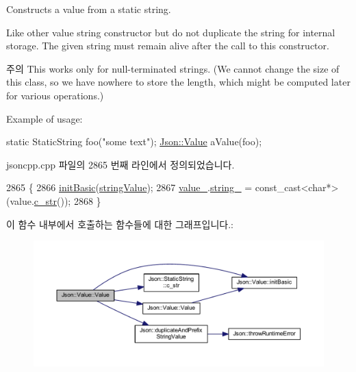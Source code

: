 Constructs a value from a static string. 

Like other value string constructor but do not duplicate the string for internal storage. The given string must remain alive after the call to this constructor. \begin{DoxyNote}{주의}
This works only for null-\/terminated strings. (We cannot change the size of this class, so we have nowhere to store the length, which might be computed later for various operations.)
\end{DoxyNote}
Example of usage\+: 
\begin{DoxyCode}
\textcolor{keyword}{static} StaticString foo(\textcolor{stringliteral}{"some text"});
\hyperlink{class_json_1_1_value}{Json::Value} aValue(foo);
\end{DoxyCode}
 

jsoncpp.\+cpp 파일의 2865 번째 라인에서 정의되었습니다.


\begin{DoxyCode}
2865                                       \{
2866   \hyperlink{class_json_1_1_value_a32b86b71564157f40f880f5736be822a}{initBasic}(\hyperlink{namespace_json_a7d654b75c16a57007925868e38212b4ea804ef857affea2d415843c73f261c258}{stringValue});
2867   \hyperlink{class_json_1_1_value_aef578244546212705b9f81eb84d7e151}{value\_}.\hyperlink{union_json_1_1_value_1_1_value_holder_a70ac2b153bc405527baa3850d2ddc3cb}{string\_} = \textcolor{keyword}{const\_cast<}\textcolor{keywordtype}{char}*\textcolor{keyword}{>}(value.\hyperlink{class_json_1_1_static_string_ad6be703d432d108623bb0aa06b0b90ca}{c\_str}());
2868 \}
\end{DoxyCode}
이 함수 내부에서 호출하는 함수들에 대한 그래프입니다.\+:\nopagebreak
\begin{figure}[H]
\begin{center}
\leavevmode
\includegraphics[width=350pt]{class_json_1_1_value_a081830e95f88a37054da7e46c65b0766_cgraph}
\end{center}
\end{figure}
\mbox{\label{class_json_1_1_value_a89ef37969ff7c6eb3a7afcca03d4cd4a}} 
